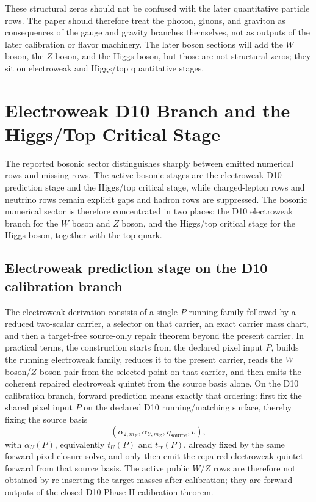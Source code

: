 \documentclass[11pt]{article}
\begin{document}
These structural zeros should not be confused with the later quantitative particle rows. The
paper should therefore treat the photon, gluons, and graviton as consequences of the
gauge and gravity branches themselves, not as outputs of the later calibration or flavor
machinery. The later boson sections will add the \(W\) boson, the \(Z\) boson, and the Higgs
boson, but those are not structural zeros; they sit on electroweak and Higgs/top quantitative stages.

\section{Electroweak D10 Branch and the Higgs/Top Critical Stage}

The reported bosonic sector distinguishes sharply between emitted numerical rows and
missing rows. The active bosonic stages are the electroweak
D10 prediction stage and the Higgs/top critical stage, while charged-lepton rows
and neutrino rows remain explicit gaps and hadron rows are suppressed. The bosonic numerical
sector is therefore concentrated in two places: the D10 electroweak branch for the \(W\) boson and \(Z\) boson, and
the Higgs/top critical stage for the Higgs boson, together with the top quark.

\subsection{Electroweak prediction stage on the D10 calibration branch}

The electroweak derivation consists of a single-\(P\) running family followed by a
reduced two-scalar carrier, a selector on that carrier, an exact carrier mass chart, and
then a target-free source-only repair theorem beyond the present carrier. In practical terms, the construction starts from
the declared pixel input \(P\), builds the running electroweak family, reduces it to the present
carrier, reads the \(W\) boson/\(Z\) boson pair from the selected point on that carrier,
and then emits the coherent repaired electroweak quintet from the source basis alone.
On the D10 calibration branch, forward prediction means exactly that ordering: first fix the shared pixel input \(P\) on the
declared D10 running/matching surface, thereby fixing the source basis
\[
(\alpha_{2,m_Z},\alpha_{Y,m_Z},\eta_{\mathrm{source}},v),
\]
with \(\alpha_U(P)\), equivalently \(t_U(P)\) and \(t_{\mathrm{tr}}(P)\), already fixed by the
same forward pixel-closure solve,
and only then emit the repaired electroweak quintet forward from that source basis. The
active public \(W/Z\) rows are therefore not obtained by re-inserting the target masses after
calibration; they are forward outputs of the closed D10 Phase-II calibration theorem.
\end{document}
